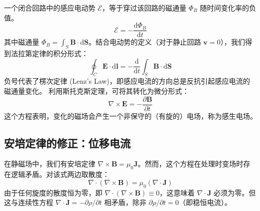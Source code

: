 \documentclass[fontset=none]{ctexart}
\begin{document}
\begin{proposition}[法拉第定律]
    一个闭合回路中的感应电动势 $\mathcal{E}$，等于穿过该回路的磁通量 $\Phi_B$ 随时间变化率的负值。
    \begin{equation}
        \mathcal{E} = - \frac{\mathrm{d}\Phi_B}{\mathrm{d}t}
    \end{equation}
    其中磁通量 $\Phi_B = \int_S \bm{B} \cdot \mathrm{d}\bm{S}$。结合电动势的定义（对于静止回路 $\bm{v}=0$），我们得到法拉第定律的积分形式：
    \begin{equation}
        \oint_C \bm{E} \cdot \mathrm{d}\bm{l} = - \frac{\mathrm{d}}{\mathrm{d}t} \int_S \bm{B} \cdot \mathrm{d}\bm{S}
    \end{equation}
    负号代表了楞次定律 (Lenz's Law)，即感应电流的方向总是反抗引起感应电流的磁通量变化。
    利用斯托克斯定理，可将其转化为微分形式：
    \begin{equation}
        \nabla \times \bm{E} = - \frac{\partial\bm{B}}{\partial t}
    \end{equation}
    这个方程表明，变化的磁场会产生一个非保守的（有旋的）电场，称为感生电场。
\end{proposition}

\subsection{安培定律的修正：位移电流}
在静磁场中，我们有安培定律 $\nabla \times \bm{B} = \mu_0 \bm{J}$。然而，这个方程在处理时变场时存在逻辑矛盾。对该式两边取散度：
\begin{equation}
    \nabla \cdot (\nabla \times \bm{B}) = \mu_0 (\nabla \cdot \bm{J})
\end{equation}
由于任何旋度的散度恒为零，即 $\nabla \cdot (\nabla \times \bm{B}) \equiv 0$，这意味着 $\nabla \cdot \bm{J}$ 必须为零。但这与连续性方程 $\nabla \cdot \bm{J} = -\partial\rho/\partial t$ 相矛盾，除非 $\partial\rho/\partial t = 0$（即稳恒电流）。
\end{document}
